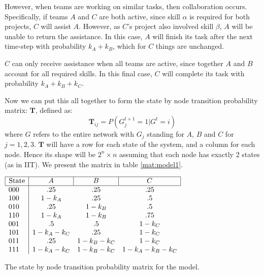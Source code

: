 \begin{steps}
	However, when teams are working on similar tasks, then collaboration occurs. Specifically, if teams $A$ and $C$ are both active, since skill $\alpha$ is required for both projects, $C$ will assist $A$. However, as $C$'s project also involved skill $\beta$, $A$ will be unable to return the assistance. In this case, $A$ will finish its task after the next time-step with probability $k_A + k_B$, which for $C$ things are unchanged. 
	
	$C$ can only receive assistance when all teams are active, since together $A$ and $B$ account for all required skills. In this final case, $C$ will complete its task with probability $k_A+k_B+k_C$.
\end{steps}


Now we can put this all together to form the state by node transition probability matrix: $\mathbf{T}$, defined as:
\begin{equation}
\mathbf{T}_{ij}= P(G_j^{t+1}=1 | G^t = i)
\end{equation}
where $G$ refers to the entire network with $G_j$ standing for $A$, $B$ and $C$ for $j=1,2,3$. $\mathbf{T}$ will have a row for each state of the system, and a column for each node. Hence its shape will be $2^n \times n$ assuming that each node has exactly 2 states (as in IIT). We present the matrix in table \ref{mat:model1}.


\begin{table}[h]
	\centering
	

	$\begin{array}{l|ccc}
	\hline
	\multicolumn{1}{|l|}{\text{State}} & \multicolumn{1}{c|}{A} & \multicolumn{1}{c|}{B} & \multicolumn{1}{c|}{C} \\ \hline
	000                         & .25                    & .25                    & .25                    \\
	100                         & 1-k_A                  & .25                    & .5                     \\
	010                         & .25                    & 1-k_B                  & .5                     \\
	110                         & 1-k_A                  & 1-k_B                  & .75                    \\
	001                         & .5                     & .5                     & 1-k_C                  \\
	101                         & 1-k_A-k_C              & .25                    & 1-k_C                  \\
	011                         & .25                    & 1-k_B-k_C              & 1-k_C                  \\
	111                         & 1-k_A-k_C              & 1-k_B-k_C              & 1-k_A-k_B-k_C         
	\end{array}$
	\caption{The state by node transition probability matrix for the model.}
	\label{mat:model1}
\end{table}

